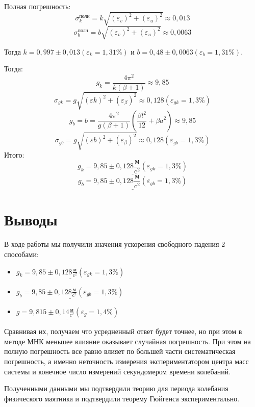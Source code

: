 \documentclass[a4paper]{article}
\begin{document}
Полная погрешность:
\[\sigma_{k}^{\text{полн}} = k\sqrt{(\varepsilon_{v})^2 + (\varepsilon_{u})^2} \approx 0,013\]
\[\sigma_{b}^{\text{полн}} = b\sqrt{(\varepsilon_{v})^2 + (\varepsilon_{u})^2} \approx 0,0063\]

Тогда $k = 0,997 \pm 0,013 (\varepsilon_{k} = 1,31\%)$ и $b = 0,48 \pm 0,0063 (\varepsilon_{b} = 1,31\%)$.

Тогда:
\[g_{k} = \frac{4\pi^2}{k(\beta + 1)} \approx 9,85\]
\[\sigma_{gk} = g \sqrt{(\varepsilon{k})^2 + (\varepsilon_{\beta})^2} \approx 0,128 (\varepsilon_{gk} = 1,3\%)\]
\[g_{b} = b = \frac{4\pi^2}{g \left( \beta + 1\right)} \left( \frac{\beta l^2}{12} + \beta a^2 \right) \approx 9,85\]
\[\sigma_{gb} = g \sqrt{(\varepsilon{b})^2 + (\varepsilon_{\beta})^2} \approx 0,128 (\varepsilon_{gb} = 1,3\%)\]
Итого:
\[\underline{g_{k} = 9,85 \pm 0,128 \frac{\text{м}}{\text{c}^2} (\varepsilon_{gk} = 1,3\%)}\]
\[\underline{g_{b} = 9,85 \pm 0,128 \frac{\text{м}}{\text{c}^2} (\varepsilon_{gb} = 1,3\%)}\]

\section{Выводы}
В ходе работы мы получили значения ускорения свободного падения 2 способами:
\begin{itemize}
    \item $\underline{g_{k} = 9,85 \pm 0,128 \frac{\text{м}}{\text{c}^2} (\varepsilon_{gk} = 1,3\%)}$
    \item $\underline{g_{b} = 9,85 \pm 0,128 \frac{\text{м}}{\text{c}^2} (\varepsilon_{gb} = 1,3\%)}$
    \item $\underline{g = 9,815 \pm 0,14 \frac{\text{м}}{\text{c}^2} (\varepsilon_{g} = 1,4\%)}$
\end{itemize}

Сравнивая их, получаем что усредненный ответ будет точнее, но при этом в методе МНК меньшее влияние оказывает случайная погрешность. При этом на полную погрешность все равно влияет по большей части систематическая погрешность, а именно неточность измерения экспериментатором центра масс системы и конечное число измерений секундомером времени колебаний.

Полученными данными мы подтвердили теорию для периода колебания физического маятника и подтвердили теорему Гюйгенса экспериментально. 
\end{document}
